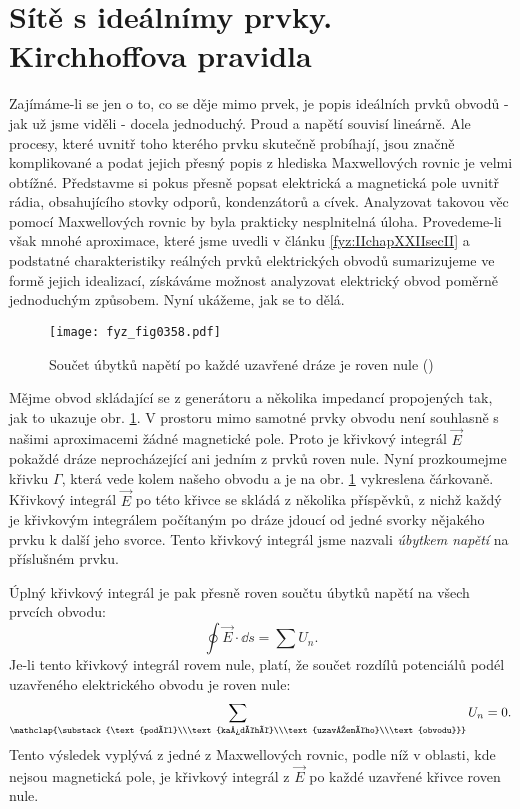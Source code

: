 \section{Sítě s ideálnímy prvky. Kirchhoffova pravidla}\label{fyz:IIchapXXIIsecIII}
  Zajímáme-li se jen o to, co se děje mimo prvek, je popis ideálních prvků obvodů - jak už jsme 
  viděli - docela jednoduchý. Proud a napětí souvisí lineárně. Ale procesy, které uvnitř toho 
  kterého prvku skutečně probíhají, jsou značně komplikované a podat jejich přesný popis z hlediska 
  Maxwellových rovnic je velmi obtížné. Představme si pokus přesně popsat elektrická a magnetická 
  pole uvnitř rádia, obsahujícího stovky odporů, kondenzátorů a cívek. Analyzovat takovou věc 
  pomocí Maxwellových rovnic by byla prakticky nesplnitelná úloha. Provedeme-li však mnohé 
  aproximace, které jsme uvedli v článku \ref{fyz:IIchapXXIIsecII} a podstatné charakteristiky 
  reálných prvků elektrických obvodů sumarizujeme ve formě jejich idealizací, získáváme možnost 
  analyzovat elektrický obvod poměrně jednoduchým způsobem. Nyní ukážeme, jak se to dělá.
  
  \begin{figure}[ht!] %
    \centering
    \texttt{[image: fyz\_fig0358.pdf]}
    \caption{Součet úbytků napětí po každé uzavřené dráze je roven nule
             (\cite[s.~399]{Feynman02})}
    \label{fyz:fig0358}
  \end{figure}
  
  Mějme obvod skládající se z generátoru a několika impedancí propojených tak, jak to ukazuje obr. 
  \ref{fyz:fig0358}. V prostoru mimo samotné prvky obvodu není souhlasně s našimi aproximacemi žádné 
  magnetické pole. Proto je křivkový integrál \(\vec{E}\) pokaždé dráze neprocházející ani jedním z 
  prvků roven nule. Nyní prozkoumejme křivku \(\Gamma\), která vede kolem našeho obvodu a je na 
  obr. \ref{fyz:fig0358} vykreslena čárkovaně. Křivkový integrál \(\vec{E}\) po této křivce se 
  skládá z několika příspěvků, z nichž každý je křivkovým integrálem počítaným po dráze jdoucí od 
  jedné svorky nějakého prvku k další jeho svorce. Tento křivkový integrál jsme nazvali 
  \emph{úbytkem napětí} na příslušném prvku.
  
  Úplný křivkový integrál je pak přesně roven součtu úbytků napětí na všech prvcích obvodu: 
  \begin{equation}\label{fyz:eq482}
    \oint\vec{E}\cdot\dd{s} = \sum U_n.
  \end{equation}
  Je-li tento křivkový integrál rovem nule, platí, že součet rozdílů potenciálů podél uzavřeného 
  elektrického obvodu je roven nule:
  \begin{equation}\label{fyz:eq483}
    \sum_{\mathclap{\substack{\text{podél}\\\text{každéhé}\\\text{uzavřeného}\\\text{obvodu}}}} 
         U_n = 0.
  \end{equation}
  Tento výsledek vyplývá z jedné z Maxwellových rovnic, podle níž v oblasti, kde nejsou magnetická 
  pole, je křivkový integrál z \(\vec{E}\) po každé uzavřené křivce roven nule. 
  

